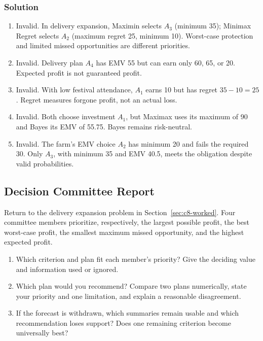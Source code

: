 \subsubsection*{Solution}
\begin{enumerate}
\item Invalid. In delivery expansion, Maximin selects $A_3$ (minimum 35); Minimax Regret selects $A_2$ (maximum regret 25, minimum 10). Worst-case protection and limited missed opportunities are different priorities.
\item Invalid. Delivery plan $A_4$ has EMV 55 but can earn only 60, 65, or 20. Expected profit is not guaranteed profit.
\item Invalid. With low festival attendance, $A_1$ earns 10 but has regret $35-10=25$. Regret measures forgone profit, not an actual loss.
\item Invalid. Both choose investment $A_1$, but Maximax uses its maximum of 90 and Bayes its EMV of 55.75. Bayes remains risk-neutral.
\item Invalid. The farm's EMV choice $A_2$ has minimum 20 and fails the required 30. Only $A_3$, with minimum 35 and EMV 40.5, meets the obligation despite valid probabilities.
\end{enumerate}

\subsection{Decision Committee Report}\label{sec:c8-report}
Return to the delivery expansion problem in Section~\ref{sec:c8-worked}. Four committee members prioritize, respectively, the largest possible profit, the best worst-case profit, the smallest maximum missed opportunity, and the highest expected profit.
\begin{enumerate}
\item Which criterion and plan fit each member's priority? Give the deciding value and information used or ignored.
\item Which plan would you recommend? Compare two plans numerically, state your priority and one limitation, and explain a reasonable disagreement.
\item If the forecast is withdrawn, which summaries remain usable and which recommendation loses support? Does one remaining criterion become universally best?
\end{enumerate}
